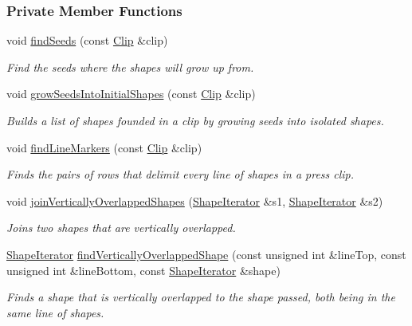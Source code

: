 \subsubsection*{Private Member Functions}
\begin{CompactItemize}
\item 
void \hyperlink{class_segmenter_bacab187b543a51c5322c01fc0a29ffb}{findSeeds} (const \hyperlink{class_clip}{Clip} \&clip)
\begin{CompactList}\small\item\em Find the seeds where the shapes will grow up from. \item\end{CompactList}\item 
void \hyperlink{class_segmenter_72c007e345fad7abbf6e9d4edb615a50}{growSeedsIntoInitialShapes} (const \hyperlink{class_clip}{Clip} \&clip)
\begin{CompactList}\small\item\em Builds a list of shapes founded in a clip by growing seeds into isolated shapes. \item\end{CompactList}\item 
void \hyperlink{class_segmenter_ad8893282742e811dd7fff172ec03c85}{findLineMarkers} (const \hyperlink{class_clip}{Clip} \&clip)
\begin{CompactList}\small\item\em Finds the pairs of rows that delimit every line of shapes in a press clip. \item\end{CompactList}\item 
void \hyperlink{class_segmenter_a6fc98922155143cf36f542118c33f3a}{joinVerticallyOverlappedShapes} (\hyperlink{_segmenter_8hpp_214be30884388589f55c966fafe805a7}{ShapeIterator} \&s1, \hyperlink{_segmenter_8hpp_214be30884388589f55c966fafe805a7}{ShapeIterator} \&s2)
\begin{CompactList}\small\item\em Joins two shapes that are vertically overlapped. \item\end{CompactList}\item 
\hyperlink{_segmenter_8hpp_214be30884388589f55c966fafe805a7}{ShapeIterator} \hyperlink{class_segmenter_dc1e127fcaa1084a990648b7f4ec1461}{findVerticallyOverlappedShape} (const unsigned int \&lineTop, const unsigned int \&lineBottom, const \hyperlink{_segmenter_8hpp_214be30884388589f55c966fafe805a7}{ShapeIterator} \&shape)
\begin{CompactList}\small\item\em Finds a shape that is vertically overlapped to the shape passed, both being in the same line of shapes. \item\end{CompactList}\end{CompactItemize}
